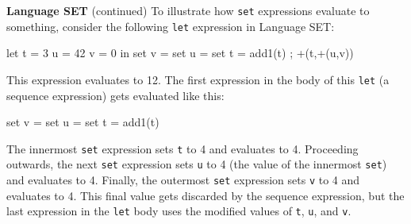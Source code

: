 \begin{minipage}[t]{\sw}
\slidenumber
\LARGE
{\bf Language SET} (continued)\exx
To illustrate how \verb'set' expressions evaluate to something,
consider the following \verb'let' expression in Language SET:
{\Large
\begin{qv}
let
  t = 3
  u = 42
  v = 0
in
  { set v = set u = set t = add1(t) ; +(t,+(u,v)) }
\end{qv}
}
This expression evaluates to 12.
The first expression in the body of this \verb'let'
(a sequence expression)
gets evaluated like this:
{\Large
\begin{qv}
    set v = { set u = { set t = add1(t) } }
\end{qv}
}
The innermost \verb'set' expression sets \verb't' to 4
and evaluates to 4.
Proceeding outwards,
the next \verb'set' expression sets \verb'u' to 4
(the value of the innermost \verb'set')
and evaluates to 4.
Finally, the outermost \verb'set' expression sets \verb'v' to 4
and evaluates to 4.
This final value gets discarded by the sequence expression,
but the last expression in the \verb'let' body uses
the modified values of \verb't', \verb'u', and \verb'v'.
\end{minipage}
\clearpage
